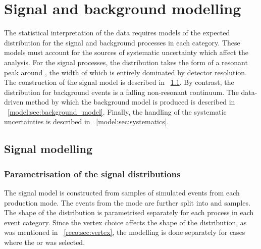 \chapter{Signal and background modelling}
\label{chap:model}

The statistical interpretation of the data requires models of the expected \mgg distribution for the signal and background processes in each category. These models must account for the sources of systematic uncertainty which affect the analysis. %
For the signal processes, the \mgg distribution takes the form of a resonant peak around \mH, the width of which is entirely dominated by detector resolution. The construction of the signal model is described in \Sec~\ref{model:sec:signal_model}. By contrast, the \mgg distribution for background events is a falling non-resonant continuum. The data-driven method by which the background model is produced is described in \Sec~\ref{model:sec:background_model}. Finally, the handling of the systematic uncertainties is described in \Sec~\ref{model:sec:systematics}. 

\section{Signal modelling}
\label{model:sec:signal_model}

\subsection{Parametrisation of the signal \mgg distributions}

The signal model is constructed from samples of simulated \Hgg events from each production mode. The events from the \VH mode are further split into \WH and \ZH samples. %
The shape of the \mgg distribution is parametrised separately for each process in each event category. Since the vertex choice affects the shape of the \mgg  distribution, as was mentioned in \Sec~\ref{reco:sec:vertex}, the modelling is done separately for cases where the \RV or \WV  was selected. 

